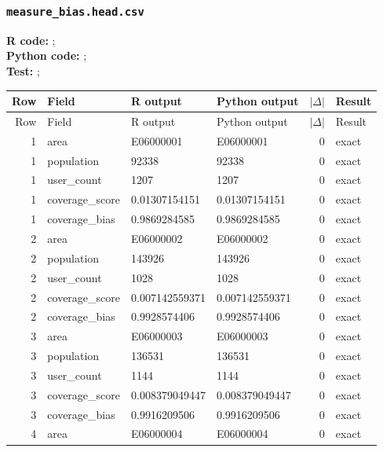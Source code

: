 \documentclass[10pt]{article}
\begin{document}
\subsubsection{\texorpdfstring{\texttt{measure\_bias.head.csv}}{measure\_bias.head.csv}}
{\footnotesize \textbf{R code:} ; \\ \textbf{Python code:} ; \\ \textbf{Test:} ; \par}

\small
\begin{longtable}{@{}r p{}p{}p{}rl@{}}
\toprule
Row & Field & R output & Python output & $|\Delta|$ & Result \\
\midrule
\endfirsthead
\toprule
Row & Field & R output & Python output & $|\Delta|$ & Result \\
\midrule
\endhead
1 & area & E06000001 & E06000001 & 0 & exact \\
1 & population & 92338 & 92338 & 0 & exact \\
1 & user\_\allowbreak{}count & 1207 & 1207 & 0 & exact \\
1 & coverage\_\allowbreak{}score & 0.01307154151 & 0.01307154151 & 0 & exact \\
1 & coverage\_\allowbreak{}bias & 0.9869284585 & 0.9869284585 & 0 & exact \\
2 & area & E06000002 & E06000002 & 0 & exact \\
2 & population & 143926 & 143926 & 0 & exact \\
2 & user\_\allowbreak{}count & 1028 & 1028 & 0 & exact \\
2 & coverage\_\allowbreak{}score & 0.007142559371 & 0.007142559371 & 0 & exact \\
2 & coverage\_\allowbreak{}bias & 0.9928574406 & 0.9928574406 & 0 & exact \\
3 & area & E06000003 & E06000003 & 0 & exact \\
3 & population & 136531 & 136531 & 0 & exact \\
3 & user\_\allowbreak{}count & 1144 & 1144 & 0 & exact \\
3 & coverage\_\allowbreak{}score & 0.008379049447 & 0.008379049447 & 0 & exact \\
3 & coverage\_\allowbreak{}bias & 0.9916209506 & 0.9916209506 & 0 & exact \\
4 & area & E06000004 & E06000004 & 0 & exact \\

\end{longtable}
\end{document}
